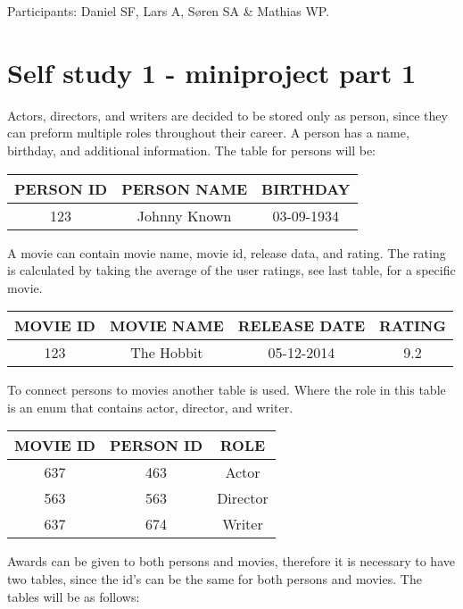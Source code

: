 \documentclass[10pt,a4paper,final]{report}
\begin{document}
Participants:
Daniel SF,
Lars A,
S\o ren SA \&
Mathias WP.


\section*{Self study 1 - miniproject part 1}
Actors, directors, and writers are decided to be stored only as person, since they can preform multiple roles throughout their career. A person has a name, birthday, and additional information. The table for persons will be:

\begin{table}[H] \centering
\begin{tabular}{|c|c|c|}
\hline 
PERSON ID & PERSON NAME & BIRTHDAY \\ 
\hline 
123 & Johnny Known & 03-09-1934 \\ 
\hline 
\end{tabular} 
\end{table}

A movie can contain movie name, movie id, release data, and rating. The rating is calculated by taking the average of the user ratings, see last table, for a specific movie.

\begin{table}[H] \centering
\begin{tabular}{|c|c|c|c|}
\hline 
MOVIE ID & MOVIE NAME & RELEASE DATE & RATING\\ 
\hline 
123 & The Hobbit & 05-12-2014 & 9.2\\ 
\hline 
\end{tabular} 
\end{table}

To connect persons to movies another table is used. Where the role in this table is an enum that contains actor, director, and writer.

\begin{table}[H] \centering
\begin{tabular}{|c|c|c|}
\hline 
MOVIE ID & PERSON ID & ROLE \\ 
\hline 
637 & 463 & Actor \\ 
\hline 
563 & 563 & Director \\ 
\hline 
637 & 674 & Writer \\ 
\hline 
\end{tabular}
\end{table}

Awards can be given to both persons and movies, therefore it is necessary to have two tables, since the id's can be the same for both persons and movies. The tables will be as follows:
\end{document}

